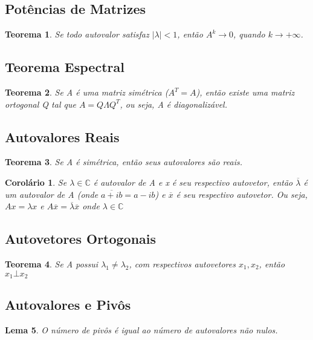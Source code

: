 \documentclass[12pt]{article}
\newtheorem{theorem}{Teorema}
\newtheorem{corollary}{Corolário}[theorem]
\newtheorem{lemma}[theorem]{Lema}
\begin{document}
\subsection*{Potências de Matrizes}
\begin{theorem} Se todo autovalor satisfaz $|\lambda| < 1$, então $A^k \rightarrow 0$, quando $k \rightarrow + \infty$.
\end{theorem}

\subsection*{Teorema Espectral}
\begin{theorem} Se A é uma matriz simétrica ($A^T = A$), então existe uma matriz ortogonal Q tal que $A = Q \Lambda Q^T$, ou seja, A é diagonalizável.
\end{theorem}

\subsection*{Autovalores Reais}
\begin{theorem} Se A é simétrica, então seus autovalores são reais.
\end{theorem}

\begin{corollary} Se $\lambda \in \mathbb{C}$ é autovalor de A e x é seu respectivo autovetor, então $\overline {\lambda}$ é um autovalor de A (onde $\overline {a + i b} = a - i b$) e $\overline{x}$ é seu respectivo autovetor. Ou seja, $A x = \lambda x$ e $A \overline{x} = \overline {\lambda} \overline {x}$ onde $\lambda \in \mathbb{C}$
\end{corollary}

\subsection*{Autovetores Ortogonais}
\begin{theorem}
Se A possui $\lambda_1 \neq \lambda_2$, com respectivos autovetores $x_1, x_2$, então $x_1 \bot x_2$
\end{theorem}

\subsection*{Autovalores e Pivôs}
\begin{lemma}
O número de pivôs é igual ao número de autovalores não nulos.
\end{lemma}
\end{document}
